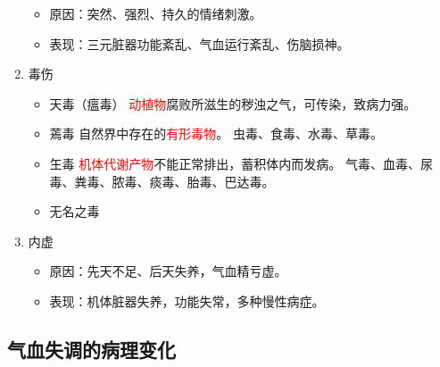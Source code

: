 \documentclass[cn,blue,12pt,normal,founder]{elegantnote}
\newcommand{\redt}[1]{\textcolor{red}{{}#1}}      %
\begin{document}
\begin{enumerate}
  \begin{itemize}
    \item 原因：突然、强烈、持久的情绪刺激。
    \item 表现：三元脏器功能紊乱、气血运行紊乱、伤脑损神。
  \end{itemize}

  \item 毒伤

  \begin{itemize}
    \item 天毒（瘟毒）
    \subitem \redt{动植物}腐败所滋生的秽浊之气，可传染，致病力强。
    \item 蔫毒
    \subitem 自然界中存在的\redt{有形毒物}。
    \subitem 虫毒、食毒、水毒、草毒。
    \item 玍毒
    \subitem \redt{机体代谢产物}不能正常排出，蓄积体内而发病。
    \subitem 气毒、血毒、尿毒、粪毒、脓毒、痰毒、胎毒、巴达毒。
    \item 无名之毒
  \end{itemize}

  \item 内虚

  \begin{itemize}
    \item 原因：先天不足、后天失养，气血精亏虚。
    \item 表现：机体脏器失养，功能失常，多种慢性病症。
  \end{itemize}
\end{enumerate}

\subsection{气血失调的病理变化}
\end{document}
